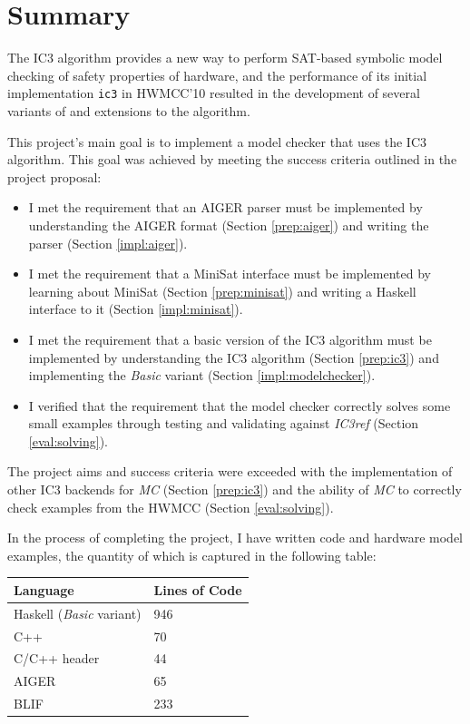 \documentclass[12pt,a4paper,twoside,openright]{report}
\begin{document}
{{\section{Summary}
\label{conc:summary}

The IC3 algorithm provides a new way to perform SAT-based symbolic model checking of
safety properties of hardware, and the performance of its initial implementation
\verb,ic3, in HWMCC'10 resulted in the development of several variants of
and extensions to the algorithm.

This project's main goal is to implement a model checker that uses the IC3 algorithm.
This goal was achieved by meeting the success criteria outlined in
the project proposal:

\begin{itemize}
\item I met the requirement that an AIGER parser must be implemented by understanding
the AIGER format (Section \ref{prep:aiger}) and writing the parser (Section
\ref{impl:aiger}).
\item I met the requirement that a MiniSat interface must be implemented by
learning about MiniSat (Section \ref{prep:minisat}) and writing a Haskell
interface to it (Section \ref{impl:minisat}).
\item I met the requirement that a basic version of the IC3 algorithm must be
implemented by
understanding the IC3 algorithm (Section \ref{prep:ic3}) and implementing the
\emph{Basic} variant (Section \ref{impl:modelchecker}).
\item I verified that the requirement that the model checker correctly solves some small
examples through testing and validating against \emph{IC3ref}
(Section \ref{eval:solving}).
\end{itemize}

The project aims and success criteria were exceeded with the implementation of other
IC3 backends for \emph{MC} (Section \ref{prep:ic3})
and the ability of \emph{MC} to correctly check examples
from the HWMCC (Section \ref{eval:solving}).

In the process of completing the project, I have written code and hardware model
examples, the quantity of which is captured in the following table:
\begin{center}
\begin{tabular}{| l | l |}
\hline
Language & Lines of Code\\
\hline
Haskell (\emph{Basic} variant) & 946\\
C++ & 70\\
C/C++ header & 44\\
AIGER & 65\\
BLIF & 233\\
\hline
\end{tabular}
\end{center}

}}
\end{document}
